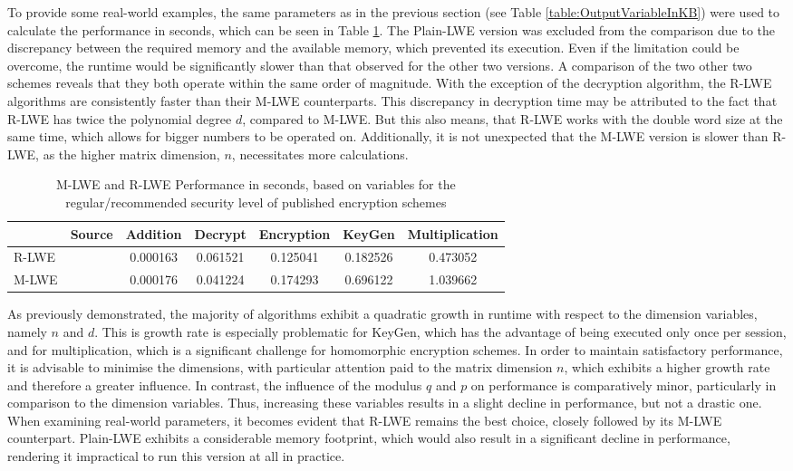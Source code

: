 To provide some real-world examples, the same parameters as in the previous section (see Table \ref{table:OutputVariableInKB}) were used to calculate the performance in seconds, which can be seen in Table \ref{table:performanceComparison}. The Plain-LWE version was excluded from the comparison due to the discrepancy between the required memory and the available memory, which prevented its execution. Even if the limitation could be overcome, the runtime would be significantly slower than that observed for the other two versions. A comparison of the two other two schemes reveals that they both operate within the same order of magnitude. With the exception of the decryption algorithm, the R-LWE algorithms are consistently faster than their M-LWE counterparts. This discrepancy in decryption time may be attributed to the fact that R-LWE has twice the polynomial degree $d$, compared to M-LWE. But this also means, that R-LWE works with the double word size at the same time, which allows for bigger numbers to be operated on. Additionally, it is not unexpected that the M-LWE version is slower than R-LWE, as the higher matrix dimension, $n$, necessitates more calculations.

\begin{table}[htp]
  \centering
  \caption{M-LWE and R-LWE Performance in seconds, based on variables for the regular/recommended security level of published encryption schemes}
  \begin{tabular}{|l|c||c|c|c|c|c|}
    \toprule
          & Source                      & Addition & Decrypt  & Encryption & KeyGen   & Multiplication \\
    \midrule
    R-LWE & \cite{PracticalKeyExchange} & 0.000163 & 0.061521 & 0.125041   & 0.182526 & 0.473052       \\
    M-LWE & \cite{CyrstalsKyber}        & 0.000176 & 0.041224 & 0.174293   & 0.696122 & 1.039662       \\
    \bottomrule
  \end{tabular}
  \label{table:performanceComparison}
\end{table}

As previously demonstrated, the majority of algorithms exhibit a quadratic growth in runtime with respect to the dimension variables, namely $n$ and $d$. This is growth rate is especially problematic for KeyGen, which has the advantage of being executed only once per session, and for multiplication, which is a significant challenge for homomorphic encryption schemes. In order to maintain satisfactory performance, it is advisable to minimise the dimensions, with particular attention paid to the matrix dimension $n$, which exhibits a higher growth rate and therefore a greater influence. In contrast, the influence of the modulus $q$ and $p$ on performance is comparatively minor, particularly in comparison to the dimension variables. Thus, increasing these variables results in a slight decline in performance, but not a drastic one. When examining real-world parameters, it becomes evident that R-LWE remains the best choice, closely followed by its M-LWE counterpart. Plain-LWE exhibits a considerable memory footprint, which would also result in a significant decline in performance, rendering it impractical to run this version at all in practice.

